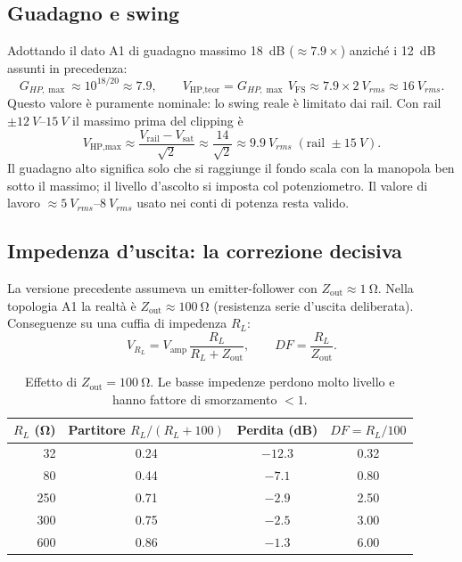 \subsection{Guadagno e swing}
Adottando il dato A1 di guadagno massimo \SI{18}{dB} ($\approx 7.9\times$)
anziché i \SI{12}{dB} assunti in precedenza:
\begin{equation}
  G_{HP,\max}\approx 10^{18/20}\approx 7.9,\qquad
  V_{\text{HP,teor}}=G_{HP,\max}\,V_{\mathrm{FS}}\approx 7.9\times\SI{2}{V_{rms}}\approx\SI{16}{V_{rms}}.
\end{equation}
Questo valore è puramente nominale: lo swing reale è limitato dai rail.
Con rail $\pm\SIrange{12}{15}{V}$ il massimo prima del clipping è
\begin{equation}
  V_{\text{HP,max}}\approx\frac{V_{\text{rail}}-V_{\text{sat}}}{\sqrt 2}
  \approx\frac{14}{\sqrt 2}\approx\SI{9.9}{V_{rms}}\;(\text{rail }\pm\SI{15}{V}).
\end{equation}
Il guadagno alto significa solo che si raggiunge il fondo scala con la
manopola ben sotto il massimo; il livello d'ascolto si imposta col
potenziometro. Il valore di lavoro $\approx\SIrange{5}{8}{V_{rms}}$ usato
nei conti di potenza resta valido.

\subsection{Impedenza d'uscita: la correzione decisiva}\label{sec:zout}
La versione precedente assumeva un emitter-follower con
$Z_{\text{out}}\approx\SI{1}{\ohm}$. Nella topologia A1 la realtà è
$Z_{\text{out}}\approx\SI{100}{\ohm}$ (resistenza serie d'uscita
deliberata). Conseguenze su una cuffia di impedenza $R_L$:
\begin{equation}
  V_{R_L}=V_{\text{amp}}\,\frac{R_L}{R_L+Z_{\text{out}}},\qquad
  DF=\frac{R_L}{Z_{\text{out}}} .
\end{equation}

\begin{table}[H]
  \centering
  \begin{tabular}{rccc}
    \toprule
    $R_L$ (\si{\ohm}) & Partitore $R_L/(R_L+100)$ & Perdita (\si{dB}) & $DF=R_L/100$ \\
    \midrule
    32  & 0.24 & $-12.3$ & 0.32 \\
    80  & 0.44 & $-7.1$  & 0.80 \\
    250 & 0.71 & $-2.9$  & 2.50 \\
    300 & 0.75 & $-2.5$  & 3.00 \\
    600 & 0.86 & $-1.3$  & 6.00 \\
    \bottomrule
  \end{tabular}
  \caption{Effetto di $Z_{\text{out}}=\SI{100}{\ohm}$. Le basse impedenze
  perdono molto livello e hanno fattore di smorzamento $<1$.}
  \label{tab:zout}
\end{table}

